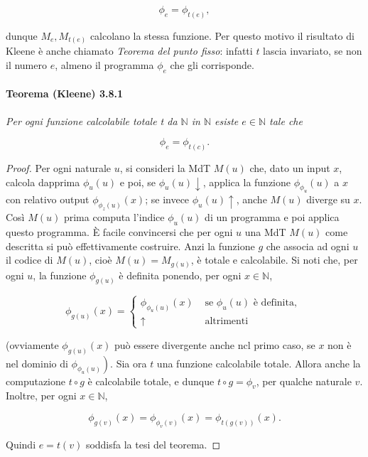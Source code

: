 \[
    \phi_e=\phi_{t(e)},
\]

dunque $M_e, M_{t(e)}$ calcolano la stessa funzione. Per questo motivo il risultato
di Kleene è anche chiamato \textit{Teorema del punto fisso}: infatti $t$ lascia invariato, se
non il numero $e$, almeno il programma $\phi_e$ che gli corrisponde.

\paragraph{Teorema (Kleene) 3.8.1} \textit{Per ogni funzione calcolabile totale t da $\mathbb{N}$ in
    $\mathbb{N}$ esiste $e \in \mathbb{N}$ tale che}

\[
    \phi_e=\phi_{t(c)} .
\]

\begin{proof}
    Per ogni naturale $u$, si consideri la MdT $M(u)$ che, dato un input
    $x$, calcola dapprima $\phi_u(u)$ e poi, se $\phi_u(u) \downarrow$, applica la
    funzione $\phi_{\phi_u}(u)$ a $x$ con relativo output $\phi_{\phi_z(u)}(x)$; se
    invece $\phi_u(u) \uparrow$, anche $M(u)$ diverge su $x$. Così $M(u)$ prima computa
    l'indice $\phi_u(u)$ di un programma e poi applica questo programma. È facile
    convincersi che per ogni $u$ una MdT $M(u)$ come descritta si può
    effettivamente costruire. Anzi la funzione $g$ che associa ad ogni $u$ il codice di
    $M(u)$, cioè $M(u)=M_{g(u)}$, è totale e calcolabile. Si noti che, per ogni $u$, la
    funzione $\phi_{g(u)}$ è definita ponendo, per ogni $x \in \mathbb{N}$,

    \[
        \phi_{g(u)}(x)=\left\{\begin{array}{cl}
            \phi_{\phi_{u}(u)}(x) & \text { se } \phi_u(u) \text { è definita, } \\
            \uparrow              & \text { altrimenti }
        \end{array}\right.
    \]

    (ovviamente $\phi_{g(u)}(x)$ può essere divergente anche ncl primo caso, se $x$ non
    è nel dominio di $\left.\phi_{\phi_u(u)}\right)$. Sia ora $t$ una funzione
    calcolabile totale. Allora anche la computazione $t \circ g$ è calcolabile totale, e
    dunque $t \circ g=\phi_v$, per qualche naturale $v$. Inoltre, per ogni $x \in
        \mathbb{N}$,

    \[
        \phi_{g(v)}(x)=\phi_{\phi_v(v)}(x)=\phi_{t(g(v))}(x) .
    \]

    Quindi $e=t(v)$ soddisfa la tesi del teorema.
\end{proof}


